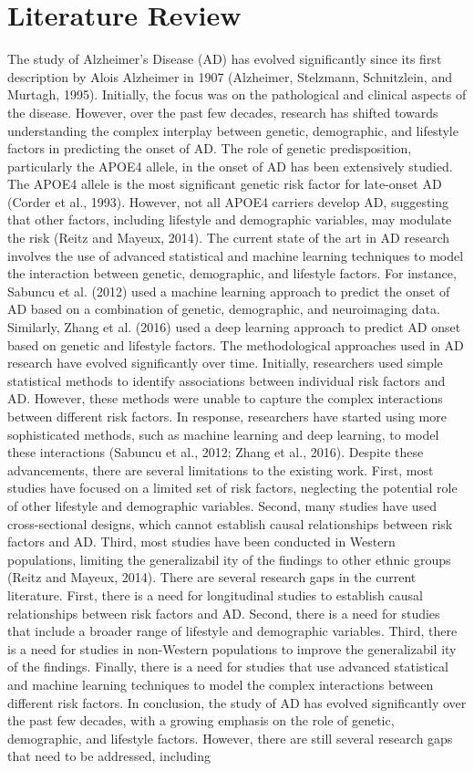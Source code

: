 \documentclass[conference]{IEEEtran}
\begin{document}
\section{Literature Review}
The study of Alzheimer's Disease (AD) has evolved significantly since its first description by Alois Alzheimer in 1907 (Alzheimer, Stelzmann, Schnitzlein, and Murtagh, 1995). Initially, the focus was on the pathological and clinical aspects of the disease. However, over the past few decades, research has shifted towards understanding the complex interplay between genetic, demographic, and lifestyle factors in predicting the onset of AD. The role of genetic predisposition, particularly the APOE4 allele, in the onset of AD has been extensively studied. The APOE4 allele is the most significant genetic risk factor for late-onset AD (Corder et al., 1993). However, not all APOE4 carriers develop AD, suggesting that other factors, including lifestyle and demographic variables, may modulate the risk (Reitz and Mayeux, 2014). The current state of the art in AD research involves the use of advanced statistical and machine learning techniques to model the interaction between genetic, demographic, and lifestyle factors. For instance, Sabuncu et al. (2012) used a machine learning approach to predict the onset of AD based on a combination of genetic, demographic, and neuroimaging data. Similarly, Zhang et al. (2016) used a deep learning approach to predict AD onset based on genetic and lifestyle factors. The methodological approaches used in AD research have evolved significantly over time. Initially, researchers used simple statistical methods to identify associations between individual risk factors and AD. However, these methods were unable to capture the complex interactions between different risk factors. In response, researchers have started using more sophisticated methods, such as machine learning and deep learning, to model these interactions (Sabuncu et al., 2012; Zhang et al., 2016). Despite these advancements, there are several limitations to the existing work. First, most studies have focused on a limited set of risk factors, neglecting the potential role of other lifestyle and demographic variables. Second, many studies have used cross-sectional designs, which cannot establish causal relationships between risk factors and AD. Third, most studies have been conducted in Western populations, limiting the generalizabil ity of the findings to other ethnic groups (Reitz and Mayeux, 2014). There are several research gaps in the current literature. First, there is a need for longitudinal studies to establish causal relationships between risk factors and AD. Second, there is a need for studies that include a broader range of lifestyle and demographic variables. Third, there is a need for studies in non-Western populations to improve the generalizabil ity of the findings. Finally, there is a need for studies that use advanced statistical and machine learning techniques to model the complex interactions between different risk factors. In conclusion, the study of AD has evolved significantly over the past few decades, with a growing emphasis on the role of genetic, demographic, and lifestyle factors. However, there are still several research gaps that need to be addressed, including 
\end{document}
